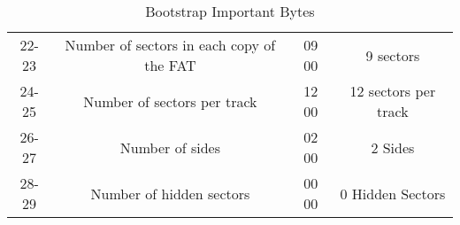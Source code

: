 \documentclass{article}
\begin{document}
\begin{table}[h]
\begin{tabular}{|c|c|c|c|}
                22-23 & Number of sectors in each copy of the FAT &
                    09 00 &
                    9 sectors \\
                24-25 & Number of sectors per track &
                    12 00 &
                    12 sectors per track\\
                26-27 & Number of sides &
                    02 00 &
                    2 Sides \\
                28-29 & Number of hidden sectors &
                    00 00 &
                    0 Hidden Sectors \\
            \hline
    \end{tabular}
    \caption{Bootstrap Important Bytes}
    \label{tab:basic}
    \end{table}
\end{document}
